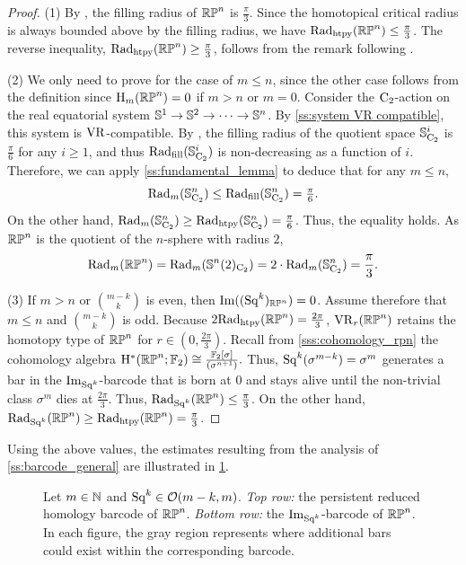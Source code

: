 \begin{proof}
	(1) By \cite{katz1983filling}, the filling radius of $\mathbb{RP}^n$ is $\frac{\pi}{3}$.
	Since the homotopical critical radius is always bounded above by the filling radius, we have $\mathrm{Rad}_{\mathrm{htpy}}(\mathbb{RP}^n) \leq \frac{\pi}{3}$.
	The reverse inequality, $\mathrm{Rad}_{\mathrm{htpy}}(\mathbb{RP}^n) \geq \frac{\pi}{3}$, follows from the remark following \cite[Theorem~4.5]{adams2022metric}.

	\smallskip (2) We only need to prove for the case of $m\leq n$, since the other case follows from the definition since \(\mathrm{H}_m(\mathbb{RP}^n) = 0\) if \(m > n\) or \(m = 0\).
	Consider the \(\mathrm{C}_2\)-action on the real equatorial system \(\mathbb{S}^{1} \to \mathbb{S}^{2} \to \dotsb \to \mathbb{S}^{n}\).
	By \cref{ss:system VR compatible}, this system is \(\mathrm{VR}\)-compatible.
	By \cite{katz1983filling}, the filling radius of the quotient space $\mathbb{S}^{i}_{\mathrm{C}_2}$ is $\frac{\pi}{6}$ for any $i \geq 1$, and thus $\mathrm{Rad}_{\mathrm{fill}}(\mathbb{S}^{i}_{\mathrm{C}_2})$ is non-decreasing as a function of \(i\).
	Therefore, we can apply \cref{ss:fundamental_lemma} to deduce that for any \(m \leq n\),
	\[
	\mathrm{Rad}_{m}(\mathbb{S}^{n}_{\mathrm{C}_2}) \leq \mathrm{Rad}_{\mathrm{fill}}(\mathbb{S}^{n}_{\mathrm{C}_2}) = \tfrac{\pi}{6}.
	\]
	On the other hand, $\mathrm{Rad}_{m}(\mathbb{S}^{n}_{\mathrm{C}_2})\geq \mathrm{Rad}_{\mathrm{htpy}}(\mathbb{S}^{n}_{\mathrm{C}_2}) = \tfrac{\pi}{6}$.
	Thus, the equality holds.
	As $\mathbb{RP}^n$ is the quotient of the $n$-sphere with radius $2$,
	\[\mathrm{Rad}_{m}(\mathbb{RP}^n) = \mathrm{Rad}_{m}(\mathbb{S}^{n}(2)_{\mathrm{C}_2}) = 2\cdot \mathrm{Rad}_{m}(\mathbb{S}^{n}_{\mathrm{C}_2}) = \frac{\pi}{3}.\]

	\smallskip (3) If $m > n$ or $\binom{m-k}{k}$ is even, then \(\operatorname{Im}((\mathrm{Sq}^k)_{\mathbb{RP}^n}) = 0\).
	Assume therefore that $m \leq n$ and $\binom{m-k}{k}$ is odd.
	Because $2\mathrm{Rad}_{\mathrm{htpy}}(\mathbb{RP}^n)=\frac{2\pi}{3}$, $\mathrm{VR}_r(\mathbb{RP}^n)$ retains the homotopy type of $\mathbb{RP}^n$ for $r \in (0,\tfrac{2\pi}{3})$.
	Recall from \cref{sss:cohomology_rpn} the cohomology algebra \(\mathrm{H}^\ast(\mathbb{RP}^n; {\mathbb{F}_2}) \cong \frac{{\mathbb{F}_2}[\sigma]}{(\sigma^{n+1})}.\)
	Thus, $\mathrm{Sq}^k(\sigma^{m-k}) = \sigma^{m}$ generates a bar in the $\operatorname{Im}_{\mathrm{Sq}^k}$-barcode that is born at $0$ and stays alive until the non-trivial class $\sigma^{m}$ dies at $\tfrac{2\pi}{3}$.
	Thus, $\mathrm{Rad}_{\mathrm{Sq}^k}(\mathbb{RP}^n) \leq \tfrac{\pi}{3}$.
	On the other hand, $\mathrm{Rad}_{\mathrm{Sq}^k}(\mathbb{RP}^n) \geq \mathrm{Rad}_{\mathrm{htpy}}(\mathbb{RP}^n) = \tfrac{\pi}{3}$.
\end{proof}

Using the above values, the estimates resulting from the analysis of \cref{ss:barcode_general} are illustrated in \cref{fig:sq barcodes}.

\begin{figure}
	\centering
	
	\caption{Let $m \in \mathbb{N}$ and $\mathrm{Sq}^k \in \mathcal{O}(m-k, m)$.
		\emph{Top row:} the persistent reduced homology barcode of $\mathbb{RP}^n$.
		\emph{Bottom row:} the $\operatorname{Im}_{\mathrm{Sq}^k}$-barcode of $\mathbb{RP}^n$.
		In each figure, the gray region represents where additional bars could exist within the corresponding barcode.}
	\label{fig:sq barcodes}
\end{figure}

